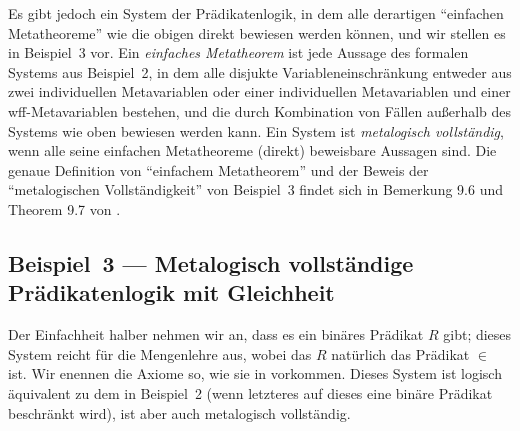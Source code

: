 Es gibt jedoch ein System der Prädikatenlogik, in dem alle derartigen "`einfachen Metatheoreme"' wie die obigen direkt bewiesen werden können, und wir stellen es in Beispiel~3 vor. Ein {\em einfaches Metatheorem} ist jede Aussage des formalen Systems aus Beispiel~2, in dem alle disjukte Variableneinschränkung entweder aus zwei individuellen Metavariablen oder einer individuellen Metavariablen und einer wff-Metavariablen bestehen, und die durch Kombination von Fällen außerhalb des Systems wie oben bewiesen werden kann.  Ein System ist {\em metalogisch vollständig}, wenn alle seine einfachen Metatheoreme (direkt) beweisbare Aussagen sind. Die genaue Definition von "`einfachem Metatheorem"' und der Beweis der "`metalogischen Vollständigkeit"' von Beispiel~3 findet sich in Bemerkung 9.6 und Theorem 9.7 von \cite{Megill}.

\begin{sloppy}
\subsection{Beispiel~3 --- Metalogisch vollständige Prädikatenlogik mit Gleichheit}
\end{sloppy}

Der Einfachheit halber nehmen wir an, dass es ein binäres Prädikat $R$ gibt; dieses System reicht für die Mengenlehre aus, wobei das $R$ natürlich das Prädikat $\in$ ist.  Wir enennen die Axiome so, wie sie in \cite{Megill} vorkommen.  Dieses System ist logisch äquivalent zu dem in Beispiel~2 (wenn letzteres auf dieses eine binäre Prädikat beschränkt wird), ist aber auch metalogisch vollständig.

